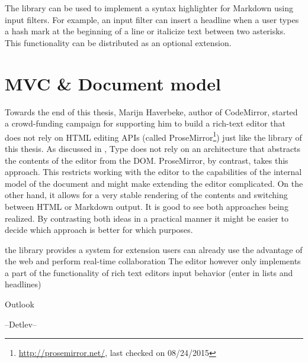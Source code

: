 The library can be used to implement a syntax highlighter for Markdown using input filters. For example, an input filter can insert a headline when a user types a hash mark at the beginning of a line or italicize text between two asterisks. This functionality can be distributed as an optional extension.

\section{MVC \& Document model}

Towards the end of this thesis, Marijn Haverbeke, author of CodeMirror, started a crowd-funding campaign for supporting him to build a rich-text editor that does not rely on HTML editing APIs (called ProseMirror\footnote{\url{http://prosemirror.net/}, last checked on 08/24/2015}) just like the library of this thesis. As discussed in , Type does not rely on an architecture that abstracts the contents of the editor from the DOM. ProseMirror, by contrast, takes this approach. This restricts working with the editor to the capabilities of the internal model of the document and might make extending the editor complicated. On the other hand, it allows for a very stable rendering of the contents and switching between HTML or Markdown output. It is good to see both approaches being realized. By contrasting both ideas in a practical manner it might be easier to decide which approach is better for which purposes.



\iffalse



the library provides a system for extension
users can already use the advantage of the web and perform real-time collaboration
The editor however only implements a part of the functionality of rich text editors
input behavior (enter in lists and headlines)

Outlook

--Detlev--

